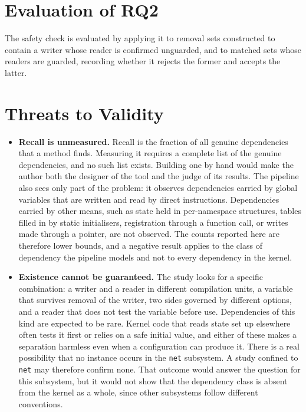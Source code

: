 \documentclass[12pt, a4paper, oneside]{book}
\begin{document}
\section{Evaluation of RQ2}

The safety check is evaluated by applying it to removal sets constructed to
contain a writer whose reader is confirmed unguarded, and to matched sets whose
readers are guarded, recording whether it rejects the former and accepts the
latter.

\section{Threats to Validity}

\begin{itemize}[leftmargin=*, itemsep=6pt]
  \item \textbf{Recall is unmeasured.} Recall is the fraction of all genuine
        dependencies that a method finds. Measuring it requires a complete list
        of the genuine dependencies, and no such list exists. Building one by hand
        would make the author both the designer of the tool and the judge of its
        results. The pipeline also sees only part of the problem: it observes
        dependencies carried by global variables that are written and read by
        direct instructions. Dependencies carried by other means, such as state
        held in per-namespace structures, tables filled in by static initialisers,
        registration through a function call, or writes made through a pointer,
        are not observed. The counts reported here are therefore lower bounds,
        and a negative result applies to the class of dependency the pipeline
        models and not to every dependency in the kernel.

  \item \textbf{Existence cannot be guaranteed.} The study looks for a specific
        combination: a writer and a reader in different compilation units, a
        variable that survives removal of the writer, two sides governed by
        different options, and a reader that does not test the variable before
        use. Dependencies of this kind are expected to be rare. Kernel code that
        reads state set up elsewhere often tests it first or relies on a safe
        initial value, and either of these makes a separation harmless even when
        a configuration can produce it. There is a real possibility that no
        instance occurs in the \texttt{net} subsystem. A study confined to
        \texttt{net} may therefore confirm none. That outcome would answer the
        question for this subsystem, but it would not show that the dependency
        class is absent from the kernel as a whole, since other subsystems
        follow different conventions.


\end{itemize}
\end{document}
